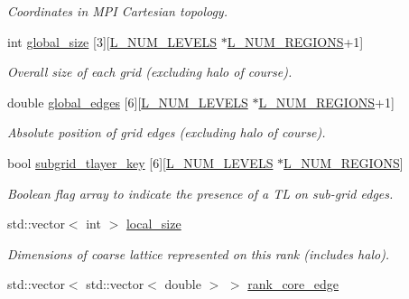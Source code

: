 \begin{DoxyCompactItemize}
\begin{DoxyCompactList}\small\item\em Coordinates in M\+PI Cartesian topology. \end{DoxyCompactList}\item 
int \hyperlink{class_mpi_manager_a3cdf6e1ce19f22daa9e84bc88bf4382d}{global\+\_\+size} \mbox{[}3\mbox{]}\mbox{[}\hyperlink{definitions_8h_a2ce7c3facc5f789b0e201757516539a5}{L\+\_\+\+N\+U\+M\+\_\+\+L\+E\+V\+E\+LS} $\ast$\hyperlink{definitions_8h_a3efeae83589481193d81da498e7f746a}{L\+\_\+\+N\+U\+M\+\_\+\+R\+E\+G\+I\+O\+NS}+1\mbox{]}
\begin{DoxyCompactList}\small\item\em Overall size of each grid (excluding halo of course). \end{DoxyCompactList}\item 
double \hyperlink{class_mpi_manager_a26f0512e19009451431d6d0ba59bf81a}{global\+\_\+edges} \mbox{[}6\mbox{]}\mbox{[}\hyperlink{definitions_8h_a2ce7c3facc5f789b0e201757516539a5}{L\+\_\+\+N\+U\+M\+\_\+\+L\+E\+V\+E\+LS} $\ast$\hyperlink{definitions_8h_a3efeae83589481193d81da498e7f746a}{L\+\_\+\+N\+U\+M\+\_\+\+R\+E\+G\+I\+O\+NS}+1\mbox{]}
\begin{DoxyCompactList}\small\item\em Absolute position of grid edges (excluding halo of course). \end{DoxyCompactList}\item 
bool \hyperlink{class_mpi_manager_a18d53c4f9968cccec36127d33776e3d4}{subgrid\+\_\+tlayer\+\_\+key} \mbox{[}6\mbox{]}\mbox{[}\hyperlink{definitions_8h_a2ce7c3facc5f789b0e201757516539a5}{L\+\_\+\+N\+U\+M\+\_\+\+L\+E\+V\+E\+LS} $\ast$\hyperlink{definitions_8h_a3efeae83589481193d81da498e7f746a}{L\+\_\+\+N\+U\+M\+\_\+\+R\+E\+G\+I\+O\+NS}\mbox{]}
\begin{DoxyCompactList}\small\item\em Boolean flag array to indicate the presence of a TL on sub-\/grid edges. \end{DoxyCompactList}\item 
std\+::vector$<$ int $>$ \hyperlink{class_mpi_manager_ad4a918a4cd19e644ff3295b2854fc6af}{local\+\_\+size}
\begin{DoxyCompactList}\small\item\em Dimensions of coarse lattice represented on this rank (includes halo). \end{DoxyCompactList}\item 
std\+::vector$<$ std\+::vector$<$ double $>$ $>$ \hyperlink{class_mpi_manager_a0211cd784c9ed1514d5968599e794313}{rank\+\_\+core\+\_\+edge}

\end{DoxyCompactItemize}
